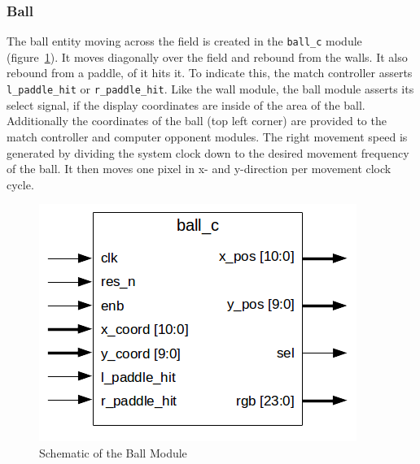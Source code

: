         \subsubsection{Ball}
            The ball entity moving across the field is created in the \texttt{ball\_c} module (figure~\ref{ball_sch}). It moves diagonally over the field and rebound from the walls. It also rebound from a paddle, of it hits it. To indicate this, the match controller asserts \texttt{l\_paddle\_hit} or \texttt{r\_paddle\_hit}. Like the wall module, the ball module asserts its select signal, if the display coordinates are inside of the area of the ball. Additionally the coordinates of the ball (top left corner) are provided to the match controller and computer opponent modules. The right movement speed is generated by dividing the system clock down to the desired movement frequency of the ball. It then moves one pixel in x- and y-direction per movement clock cycle.
	        \begin{figure}[h]
		        \centering
		        \includegraphics[scale=0.7]{images/ball_schematic.png}
		        \caption{Schematic of the Ball Module}
		        \label{ball_sch}
	        \end{figure}
